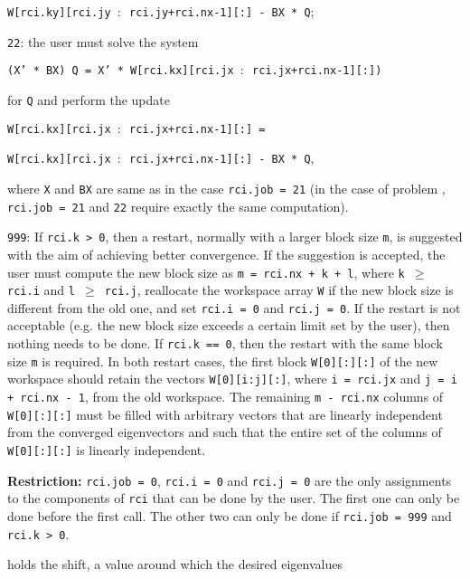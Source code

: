 \begin{description}
\begin{description}
\hspace{12mm}
{\tt W[rci.ky][rci.jy $:$ rci.jy+rci.nx-1][:] - BX * Q};
%
\item
{\tt 22}: 
the user must solve the system

\hspace{8mm}
{\tt (X' * BX) Q = 
X' * W[rci.kx][rci.jx $:$ rci.jx+rci.nx-1][:])}

for {\tt Q}  and perform the update

\hspace{8mm}
{\tt W[rci.kx][rci.jx $:$ rci.jx+rci.nx-1][:] =}

\hspace{12mm}
{\tt W[rci.kx][rci.jx $:$ rci.jx+rci.nx-1][:] - BX * Q},

where {\tt X} and {\tt BX} are same as in 
the case {\tt rci.job = 21}
(in the case of problem ,
{\tt rci.job = 21} and {\tt 22} 
require exactly the same computation).
%
\item
{\tt 999}: 
If {\tt rci.k > 0}, then
a restart, normally with a larger block size {\tt m},
is suggested with the aim of achieving better convergence.
If the suggestion is accepted, the user must compute
the new block size as {\tt m = rci.nx + k + l},
where {\tt k $\ge$ rci.i} and {\tt l $\ge$ rci.j},
reallocate the workspace array {\tt W}
if the new block size is different from the old one,
and set {\tt rci.i = 0} and {\tt rci.j = 0}.
If the restart is not acceptable
(e.g. the new block size exceeds a certain limit set by the user), 
then nothing needs to be done.
If {\tt rci.k == 0}, then
the restart with the same block size {\tt m} is required.
In both restart cases,
the first block {\tt W[0][:][:]} of the new
workspace should retain the vectors 
{\tt W[0][i:j][:]},
where {\tt i = rci.jx} and {\tt j = i + rci.nx - 1},
from the old workspace.
The remaining {\tt m - rci.nx} columns of {\tt W[0][:][:]}
must be filled
with arbitrary vectors that are linearly independent from 
the converged eigenvectors and such that
the entire set of the columns of {\tt W[0][:][:]}
is linearly independent.
%
\end{description}
%
{\bf Restriction:} 
{\tt rci.job = 0}, 
{\tt rci.i = 0} and
{\tt rci.j = 0} 
are the only %
assignments to the components of {\tt rci}
that can be done
by the user.
The first one can only be done before the first call.
The other two can only be done if
{\tt rci.job = 999} and {\tt rci.k > 0}.
%
\item[\texttt{sigma}] holds the shift, 
a value around which the desired eigenvalues

\end{description}
